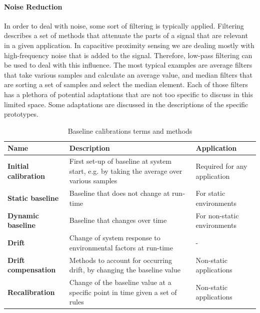 \paragraph{Noise Reduction}
In order to deal with noise, some sort of filtering is typically applied. Filtering describes a set of methods that attenuate the parts of a signal that are relevant in a given application. In capacitive proximity sensing we are dealing mostly with high-frequency noise that is added to the signal. Therefore, low-pass filtering can be used to deal with this influence. The most typical examples are average filters that take various samples and calculate an average value, and median filters that are sorting a set of samples and select the median element. Each of those filters has a plethora of potential adaptations that are not too specific to discuss in this limited space. Some adaptations are discussed in the descriptions of the specific prototypes.
\begin{table}[htbp]
  \centering
  \caption{Baseline calibrations terms and methods}
    \begin{tabular}{lp{6cm}p{5cm}}
    \toprule
    \textbf{Name} & \textbf{Description} & \textbf{Application} \\
    \midrule
    \textbf{Initial calibration} & First set-up of baseline at system start, e.g. by taking the average over various samples & Required for any application \\ \addlinespace
    \textbf{Static baseline} & Baseline that does not change at run-time & For static environments \\ \addlinespace
    \textbf{Dynamic baseline} & Baseline that changes over time & For non-static environments \\ \addlinespace
    \textbf{Drift } & Change of system response to environmental factors at run-time & - \\ \addlinespace
    \textbf{Drift compensation} & Methods to account for occurring drift, by changing the baseline value & Non-static applications \\ \addlinespace
    \textbf{Recalibration} & Change of the baseline value at a specific point in time given a set of rules & Non-static applications \\
    \bottomrule
    \end{tabular}%
  \label{tab:rel_baseline}%
\end{table}%

